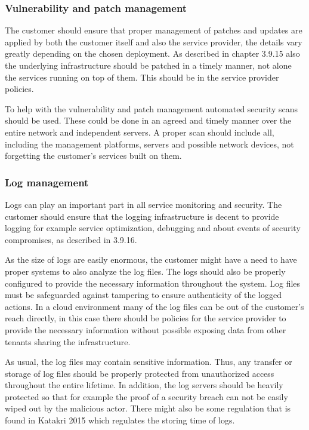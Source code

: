 \documentclass{article}
\begin{document}
\subsubsection{Vulnerability and patch management}
The customer should ensure that proper management of patches and updates are applied by both the customer itself and also the service provider, the details vary greatly depending on the chosen deployment. As described in chapter 3.9.15 also the underlying infrastructure should be patched in a timely manner, not alone the services running on top of them. This should be in the service provider policies.
\par
To help with the vulnerability and patch management automated security scans should be used. These could be done in an agreed and timely manner over the entire network and independent servers. A proper scan should include all, including the management platforms, servers and possible network devices, not forgetting the customer's services built on them.

\subsubsection{Log management}
Logs can play an important part in all service monitoring and security. The customer should ensure that the logging infrastructure is decent to provide logging for example service optimization, debugging and about events of security compromises, as described in 3.9.16.
\par
As the size of logs are easily enormous, the customer might have a need to have proper systems to also analyze the log files. The logs should also be properly configured to provide the necessary information throughout the system. Log files must be safeguarded against tampering to ensure authenticity of the logged actions. In a cloud environment many of the log files can be out of the customer's reach directly, in this case there should be policies for the service provider to provide the necessary information without possible exposing data from other tenants sharing the infrastructure.
\par
As usual, the log files may contain sensitive information. Thus, any transfer or storage of log files should be properly protected from unauthorized access throughout the entire lifetime. In addition, the log servers should be heavily protected so that for example the proof of a security breach can not be easily wiped out by the malicious actor. There might also be some regulation that is found in Katakri 2015 which regulates the storing time of logs.
\end{document}
